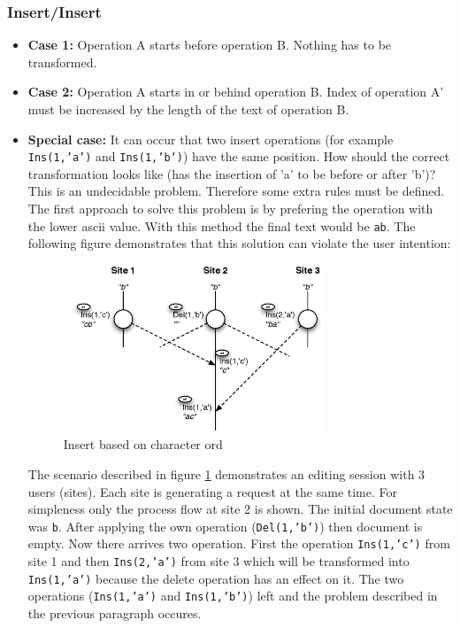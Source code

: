 \subsubsection{Insert/Insert}
\begin{itemize}
\item \textbf{Case 1:}
Operation A starts before operation B. Nothing has to be transformed.
\item \textbf{Case 2:}
Operation A starts in or behind operation B. Index of operation A' must be increased by the length of the text of operation B.
\item \textbf{Special case:}
It can occur that two insert operations (for example \texttt{Ins(1,'a')} and \texttt{Ins(1,'b')}) have the same position. How should the correct transformation looks like (has the insertion of 'a' to be before or after 'b')? This is an undecidable problem. Therefore some extra rules must be defined. The first approach to solve this problem is by prefering the operation with the lower ascii value. With this method the final text would be \texttt{ab}. The following figure demonstrates that this solution can violate the user intention:
\begin{figure}[H]
\centering
\includegraphics[height=5cm,width=8cm]{../../images/algo-impl/transform_ins_ins_char.eps}
\caption{Insert based on character ord}
\label{Insert based on character ord}
\end{figure}
The scenario described in figure \ref{Insert based on character ord} demonstrates an editing session with 3 users (sites). Each site is generating a request at the same time. For simpleness only the process flow at site 2 is shown. The initial document state was \texttt{b}. After applying the own operation (\texttt{Del(1,'b')}) then document is empty. Now there arrives two operation. First the operation \texttt{Ins(1,'c')} from site 1 and then \texttt{Ins(2,'a')} from site 3 which will be transformed into \texttt{Ins(1,'a')} because the delete operation has an effect on it. The two operations (\texttt{Ins(1,'a')} and \texttt{Ins(1,'b')}) left and the problem described in the previous paragraph occures.


\end{itemize}
